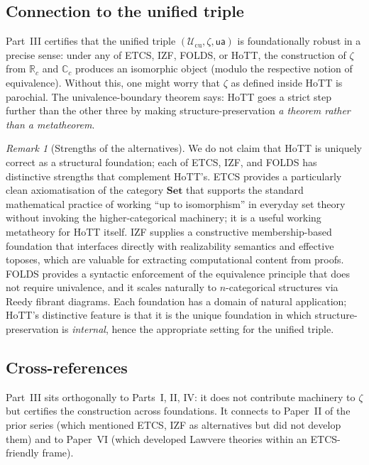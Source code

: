 \documentclass[12pt]{article}
\theoremstyle{definition}
\theoremstyle{remark}
\newtheorem{remark}[theorem]{Remark}
\newcommand{\Type}{\mathcal{U}}
\newcommand{\R}{\mathbb{R}}
\newcommand{\C}{\mathbb{C}}
\newcommand{\Rc}{\R_{c}}
\newcommand{\Cc}{\C_{c}}
\newcommand{\Set}{\mathbf{Set}}
\newcommand{\ua}{\mathsf{ua}}
\begin{document}
\subsection{Connection to the unified triple}

Part~III certifies that the unified triple
$(\Type_{\mathrm{cu}}, \zeta, \ua)$ is foundationally robust in a precise
sense: under any of ETCS, IZF, FOLDS, or HoTT, the construction of
$\zeta$ from $\Rc$ and $\Cc$ produces an isomorphic object (modulo the
respective notion of equivalence). Without this, one might worry that
$\zeta$ as defined inside HoTT is parochial. The univalence-boundary
theorem says: HoTT goes a strict step further than the other three by
making structure-preservation \emph{a theorem rather than a metatheorem}.

\begin{remark}[Strengths of the alternatives]\label{rem:partIIIstrengths}
We do not claim that HoTT is uniquely correct as a structural foundation;
each of ETCS, IZF, and FOLDS has distinctive strengths that complement
HoTT's. ETCS provides a particularly clean axiomatisation of the
category $\Set$ that supports the standard mathematical practice of
working ``up to isomorphism'' in everyday set theory without invoking
the higher-categorical machinery; it is a useful working metatheory for
HoTT itself. IZF supplies a constructive membership-based foundation
that interfaces directly with realizability semantics and effective
toposes, which are valuable for extracting computational content from
proofs. FOLDS provides a syntactic enforcement of the equivalence
principle that does not require univalence, and it scales naturally to
$n$-categorical structures via Reedy fibrant diagrams. Each foundation
has a domain of natural application; HoTT's distinctive feature is that
it is the unique foundation in which structure-preservation is
\emph{internal}, hence the appropriate setting for the unified triple.
\end{remark}

\subsection{Cross-references}

Part~III sits orthogonally to Parts~I, II, IV: it does not contribute
machinery to $\zeta$ but certifies the construction across foundations.
It connects to Paper~II of the prior series (which mentioned ETCS, IZF
as alternatives but did not develop them) and to Paper~VI (which
developed Lawvere theories within an ETCS-friendly frame).
\end{document}
